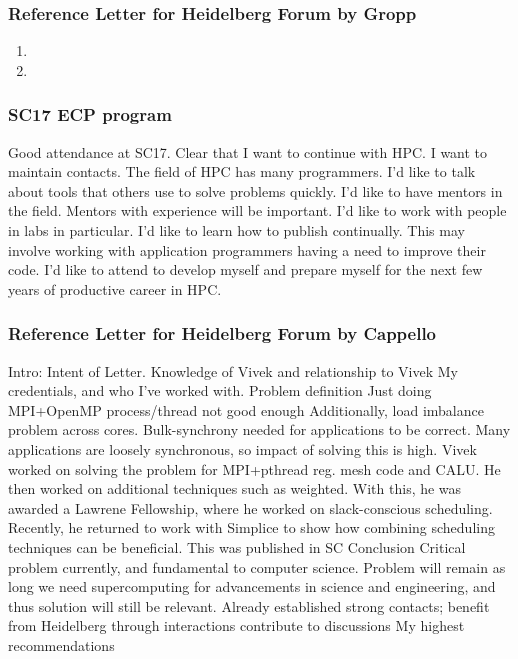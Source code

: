 \begin{frame}
\frametitle{Reference Letter for Heidelberg Forum by Gropp} 
\begin{enumerate} 
\tiny \item \tiny 
\item \tiny 
\end{enumerate} 
\end{frame} 


\begin{frame} 
\frametitle{SC17 ECP program} 

\begin{outline}[enumerate]
\tiny \1 {\tiny  } 
\tiny \1 {\tiny Good attendance at SC17. }
\tiny \1 {\tiny Clear that I want to continue with HPC. I want to maintain contacts. } 
\tiny \1 {\tiny The field of HPC has many programmers. I'd like to talk about tools that others use to solve problems quickly.} 
\tiny \1 {\tiny I'd like to have mentors in the field. Mentors with experience will be important. I'd like to work with people in labs in particular. } 
\tiny \1 {\tiny I'd like to learn how to publish continually. This may involve working with application programmers having a need to improve their code. }
\tiny \1 {\tiny I'd like to attend to develop myself and prepare myself for the next few years of productive career in HPC.}
\end{outline}


\end{frame} 


\begin{frame}
\frametitle{Reference Letter for Heidelberg Forum by Cappello}
\begin{outline}[enumerate]
\tiny \1 {\tiny Intro:}
\tiny \2 {\tiny Intent of Letter.}
\tiny \2 {\tiny Knowledge of Vivek and relationship to Vivek}
\tiny \2 {\tiny My credentials, and who I've worked with.}
\tiny \1 {\tiny Problem definition}
\tiny \2 {\tiny Just doing MPI+OpenMP process/thread not good enough}
\tiny \2 {\tiny Additionally, load imbalance problem across cores.}
\tiny \2 {\tiny Bulk-synchrony needed for applications to be correct.}
\tiny \2 {\tiny Many applications are loosely synchronous, so impact of solving this is high.}
\tiny \1 {\tiny Vivek worked on solving the problem for MPI+pthread
  reg. mesh code and CALU.} 
\tiny \1 {\tiny He then worked on additional techniques such as weighted. } 
\tiny \1 {\tiny With this, he was awarded a Lawrene Fellowship, where
  he worked on slack-conscious scheduling. } 
\tiny \1 {\tiny Recently, he returned to work with Simplice to show
  how combining scheduling techniques can be beneficial. This was
  published in SC} 
\tiny \1 {\tiny Conclusion}
\tiny \2 {\tiny Critical problem currently, and fundamental to
  computer science. Problem will remain as long we need supercomputing
  for advancements in science and engineering, and thus solution will
  still be relevant.}
\tiny \2 {\tiny Already established strong contacts; benefit from
  Heidelberg through interactions contribute to discussions}
\tiny \2 { My highest recommendations} 
\end{outline} 
\end{frame}

